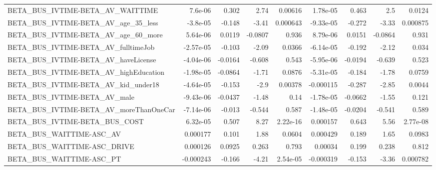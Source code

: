 \begin{tabular}{lrrrrrrrr}
BETA\_BUS\_IVTIME-BETA\_AV\_WAITTIME                   &     7.6e-06 &        0.302 &     2.74 &  0.00616 &   1.78e-05 &       0.463 &          2.5 &        0.0124 \\
BETA\_BUS\_IVTIME-BETA\_AV\_age\_35\_less                &    -3.8e-05 &       -0.148 &    -3.41 & 0.000643 &  -9.33e-05 &      -0.272 &        -3.33 &      0.000875 \\
BETA\_BUS\_IVTIME-BETA\_AV\_age\_60\_more                &    5.64e-06 &       0.0119 &  -0.0807 &    0.936 &   8.79e-06 &      0.0151 &      -0.0864 &         0.931 \\
BETA\_BUS\_IVTIME-BETA\_AV\_fulltimeJob                &   -2.57e-05 &       -0.103 &    -2.09 &   0.0366 &  -6.14e-05 &      -0.192 &        -2.12 &         0.034 \\
BETA\_BUS\_IVTIME-BETA\_AV\_haveLicense                &   -4.04e-06 &      -0.0164 &   -0.608 &    0.543 &  -5.95e-06 &     -0.0194 &       -0.639 &         0.523 \\
BETA\_BUS\_IVTIME-BETA\_AV\_highEducation              &   -1.98e-05 &      -0.0864 &    -1.71 &   0.0876 &  -5.31e-05 &      -0.184 &        -1.78 &        0.0759 \\
BETA\_BUS\_IVTIME-BETA\_AV\_kid\_under18                &   -4.64e-05 &       -0.153 &     -2.9 &  0.00378 &  -0.000115 &      -0.287 &        -2.85 &        0.0044 \\
BETA\_BUS\_IVTIME-BETA\_AV\_male                       &   -9.43e-06 &      -0.0437 &    -1.48 &     0.14 &  -1.78e-05 &     -0.0662 &        -1.55 &         0.121 \\
BETA\_BUS\_IVTIME-BETA\_AV\_moreThanOneCar             &   -7.14e-06 &       -0.013 &   -0.544 &    0.587 &  -1.48e-05 &     -0.0204 &       -0.541 &         0.589 \\
BETA\_BUS\_IVTIME-BETA\_BUS\_COST                      &    6.32e-05 &        0.507 &     8.27 & 2.22e-16 &   0.000157 &       0.643 &         5.56 &      2.77e-08 \\
BETA\_BUS\_WAITTIME-ASC\_AV                           &    0.000177 &        0.101 &     1.88 &   0.0604 &   0.000429 &       0.189 &         1.65 &        0.0983 \\
BETA\_BUS\_WAITTIME-ASC\_DRIVE                        &    0.000126 &       0.0925 &    0.263 &    0.793 &    0.00034 &       0.199 &        0.238 &         0.812 \\
BETA\_BUS\_WAITTIME-ASC\_PT                           &   -0.000243 &       -0.166 &    -4.21 & 2.54e-05 &  -0.000319 &      -0.153 &        -3.36 &      0.000782 \\

\end{tabular}
